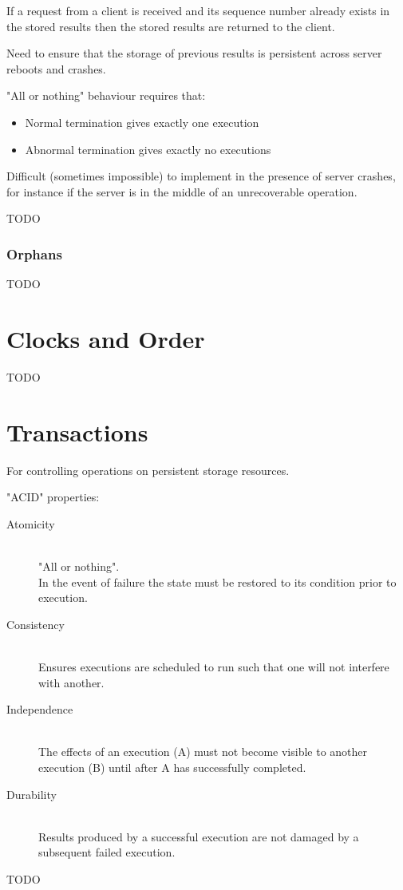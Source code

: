 \documentclass[a4paper]{article}
\begin{document}
If a request from a client is received and its sequence number already exists in
the stored results then the stored results are returned to the client.

Need to ensure that the storage of previous results is persistent across server
reboots and crashes.


"All or nothing" behaviour requires that:

\begin{itemize}
  \item Normal termination gives exactly one execution
  \item Abnormal termination gives exactly no executions
\end{itemize}

Difficult (sometimes impossible) to implement in the presence of server crashes,
for instance if the server is in the middle of an unrecoverable operation.

TODO

\subsubsection{Orphans}
\label{sec:rpc_orphans}

TODO

\section{Clocks and Order}
\label{sec:clocks_and_order}

TODO

\section{Transactions}
\label{sec:transactions}

For controlling operations on persistent storage resources.

"ACID" properties:

\begin{description}
  \item[Atomicity] \hfill \\
    "All or nothing". \\
    In the event of failure the state must be restored to its condition prior to
    execution.
  \item[Consistency] \hfill \\
    Ensures executions are scheduled to run such that one will not interfere
    with another.
  \item[Independence] \hfill \\
    The effects of an execution (A) must not become visible to another execution
    (B) until after A has successfully completed.
  \item[Durability] \hfill \\
    Results produced by a successful execution are not damaged by a subsequent
    failed execution.
\end{description}

TODO
\end{document}
